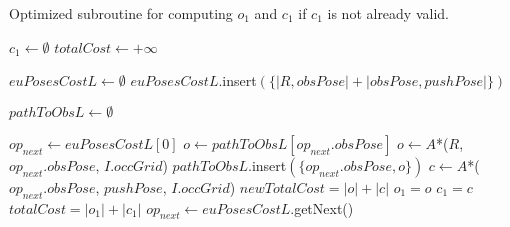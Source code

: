 \begin{algorithm}[H]
  \begin{algorithmic}[1]

    \caption{Optimized subroutine for computing $o_{1}$ and $c_{1}$ if $c_{1}$ is not already valid.}

    \label{alg:04-custom-observation-optimized-compute01c1}

      \State $c_{1} \gets \emptyset$
      \State $totalCost \gets +\infty$


      \State $euPosesCostL \gets \emptyset$ 
        \State $euPosesCostL$.insert$(\{|{R, obsPose}| + |{obsPose, pushPose}|\})$
      \EndFor

      \State $pathToObsL \gets \emptyset$

        \State $op_{next} \gets euPosesCostL[0]$
            \State $o \gets pathToObsL[op_{next}.obsPose]$
          \Else
            \State $o \gets A$*($R$, $op_{next}.obsPose$, $I.occGrid$)
            \State $pathToObsL$.insert$(\{op_{next}.obsPose, o\})$
          \EndIf
          \State $c \gets A$*($op_{next}.obsPose$, $pushPose$, $I.occGrid$)
          \State $newTotalCost = |o| + |c|$
            \State $o_{1} = o$
            \State $c_{1} = c$
            \State $totalCost = |o_{1}| + |c_{1}|$
          \EndIf
          \State $op_{next} \gets euPosesCostL$.getNext()
        \EndWhile
      \EndIf
    \EndProcedure

  \end{algorithmic}
\end{algorithm}
